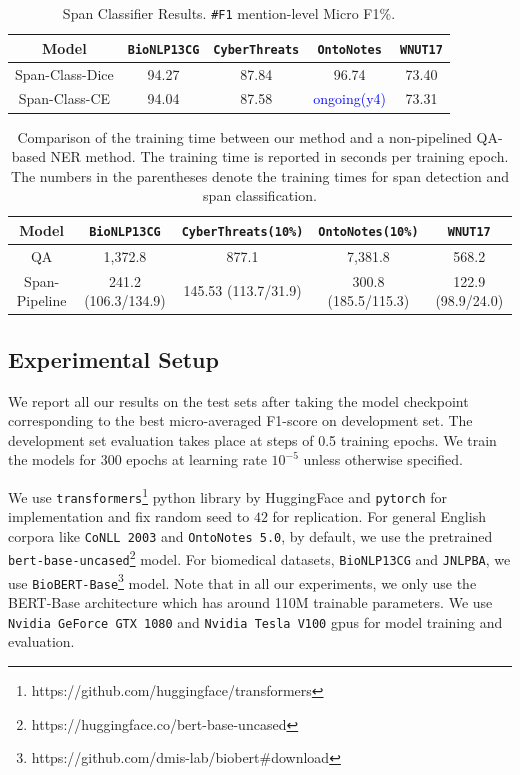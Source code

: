 \begin{table}[h!]
\centering
\begin{small}
\begin{tabular}{ccccc}\toprule
 \textbf{Model} & \texttt{BioNLP13CG} & \texttt{CyberThreats} & \texttt{OntoNotes} & \texttt{WNUT17} \\ \toprule 
Span-Class-Dice & 94.27 & 87.84 &  96.74 & 73.40  \\
Span-Class-CE     & 94.04 & 87.58 & \textcolor{blue}{ongoing(y4)} & 73.31  \\
\bottomrule
\end{tabular}
\caption{Span Classifier Results. \texttt{\#F1} mention-level Micro F1\%.}
\label{tab:class_ablation}
\end{small}
\end{table}

\begin{table}[h!]
\centering
\begin{small}
\begin{tabular}{ccccc}\toprule
 \textbf{Model} & \texttt{BioNLP13CG} & \texttt{CyberThreats(10\%)} & \texttt{OntoNotes(10\%)} & \texttt{WNUT17} \\ \toprule 
QA                & 1,372.8 & 877.1 &  7,381.8   & 568.2\\
Span-Pipeline     & 241.2 (106.3/134.9) & 145.53 (113.7/31.9) & 300.8 (185.5/115.3)  & 122.9 (98.9/24.0)\\
\bottomrule
\end{tabular}
\caption{Comparison of the training time between our method and a non-pipelined QA-based NER method. 
    The training time is reported in seconds per training epoch. The numbers in the parentheses denote the training times for span detection and span classification. }
\label{tab:train_time_ablation}
\end{small}
\end{table}

\subsection{Experimental Setup}
We report all our results on the test sets after taking the model checkpoint corresponding to the best micro-averaged F1-score on development set. The development set evaluation takes place at steps of 0.5 training epochs. We train the models for $300$ epochs at learning rate $10^{-5}$ unless otherwise specified.

We use \texttt{transformers}\footnote{https://github.com/huggingface/transformers} python library by HuggingFace and \texttt{pytorch} for implementation and fix random seed to $42$ for replication. For general English corpora like \texttt{CoNLL 2003} and \texttt{OntoNotes 5.0}, by default, we use the pretrained \texttt{bert-base-uncased}\footnote{https://huggingface.co/bert-base-uncased} model. For biomedical datasets, \texttt{BioNLP13CG} and \texttt{JNLPBA}, we use \texttt{BioBERT-Base}\footnote{https://github.com/dmis-lab/biobert\#download} model. Note that in all our experiments, we only use the BERT-Base architecture which has around 110M trainable parameters. We use \texttt{Nvidia GeForce GTX 1080} and \texttt{Nvidia Tesla V100} gpus for model training and evaluation.

